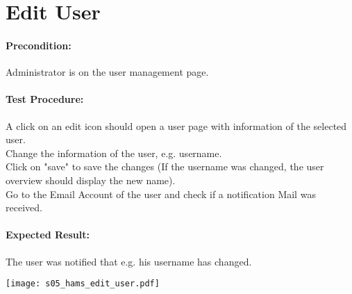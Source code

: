 \documentclass{scrreprt}
\begin{document}
\begin{minipage}[c]{0.4\textwidth}
\section{Edit User}

\paragraph{Precondition:}
Administrator is on the user management page.\\

\paragraph{Test Procedure:}
A click on an edit icon should open a user page with information of the selected user.\\
Change the information of the user, e.g. username.\\
Click on "save" to save the changes (If the username was changed, the user overview should display the new name).\\
Go to the Email Account of the user and check if a notification Mail was
received.\\

\paragraph{Expected Result:}
The user was notified that e.g. his username has changed.

\end{minipage}
\hfill
\begin{minipage}[c]{0.5\textwidth}
	\texttt{[image: s05\_hams\_edit\_user.pdf]}
\end{minipage}
\end{document}
